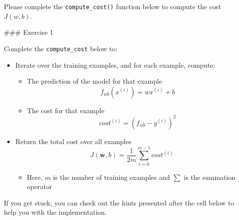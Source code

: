 \documentclass[11pt]{article}
\providecommand{\tightlist}{%
      \setlength{\itemsep}{0pt}\setlength{\parskip}{0pt}}
\begin{document}
Please complete the \texttt{compute\_cost()} function below to compute
the cost \(J(w,b)\).

    \#\#\# Exercise 1

Complete the \texttt{compute\_cost} below to:

\begin{itemize}
\tightlist
\item
  Iterate over the training examples, and for each example, compute:

  \begin{itemize}
  \item
    The prediction of the model for that example \[
      f_{wb}(x^{(i)}) =  wx^{(i)} + b 
      \]
  \item
    The cost for that example \[cost^{(i)} =  (f_{wb} - y^{(i)})^2\]
  \end{itemize}
\item
  Return the total cost over all examples
  \[J(\mathbf{w},b) = \frac{1}{2m} \sum\limits_{i = 0}^{m-1} cost^{(i)}\]

  \begin{itemize}
  \tightlist
  \item
    Here, \(m\) is the number of training examples and \(\sum\) is the
    summation operator
  \end{itemize}
\end{itemize}

If you get stuck, you can check out the hints presented after the cell
below to help you with the implementation.
\end{document}
